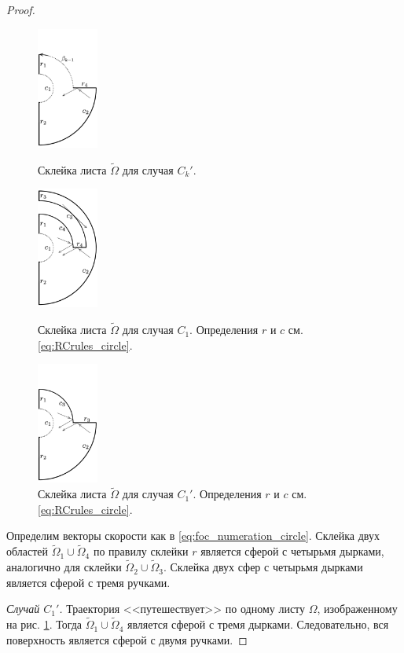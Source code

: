 \begin{proof}
\begin{figure}[!htb]
\centering
\includegraphics[width=2cm]{images/ch4/section3_circular/atoms/branching/sect3_Ck_prime_domain.pdf}
    \caption{Склейка листа $\widetilde{\Omega}$ для случая $C_k'$.}
    \label{fig:pt10:_Ck_prime_domain}
    \endminipage\hfill
{}
\centering
\includegraphics[width=2cm]{images/ch4/section3_circular/atoms/branching/sect3_C1_domain_2.pdf}
    \caption{Склейка листа $\widetilde{\Omega}$ для случая $C_1$. Определения $r$ и $c$ см. \eqref{eq:RCrules_circle}.}
    \label{fig:pt10:_C1_domain_2}
    \endminipage\hfill
{}
\centering
\includegraphics[width=2cm]{images/ch4/section3_circular/atoms/branching/sect3_C1Prime_domain_2.pdf}
    \caption{Склейка листа $\widetilde{\Omega}$ для случая $C_1'$. Определения $r$ и $c$ см. \eqref{eq:RCrules_circle}.}
    \label{fig:pt10:_C1_prime_domain_2}
\endminipage\hfill
\end{figure}


Определим векторы скорости как в \eqref{eq:foc_numeration_circle}. Склейка двух областей $\widetilde{\Omega}_1 \cup \widetilde{\Omega}_4$ по правилу склейки $r$ является сферой с четырьмя дырками, аналогично для склейки $\widetilde{\Omega}_2 \cup \widetilde{\Omega}_3$. Склейка двух сфер с четырьмя дырками является сферой с тремя ручками.

\textit{Случай $C_1'$.} Траектория <<путешествует>> по одному листу $\Omega$, изображенному на рис. \ref{fig:pt10:_C1_prime_domain_2}. Тогда $\widetilde{\Omega}_1 \cup \widetilde{\Omega}_4$ является сферой с тремя дырками. Следовательно, вся поверхность является сферой с двумя ручками.
\end{proof}

